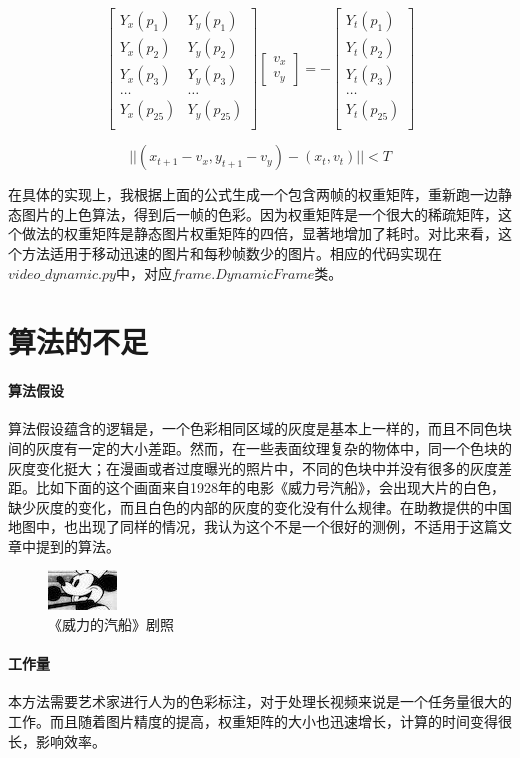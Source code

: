 \documentclass{article}
\begin{document}
\begin{equation}
\left[
\begin{array}{cc}
Y_x(p_1) & Y_y(p_1)\\
Y_x(p_2) & Y_y(p_2)\\
Y_x(p_3) & Y_y(p_3)\\
\ldots & \ldots \\
Y_x(p_{25}) & Y_y(p_{25})\\
\end{array}
\right]
\left[
\begin{array}{c}
v_x\\
v_y
\end{array}
\right]
= - 
\left[
\begin{array}{c}
Y_t(p_1)\\
Y_t(p_2)\\
Y_t(p_3)\\
\ldots\\
Y_t(p_{25})\\
\end{array}
\right]
\end{equation}

\begin{equation}
||(x_{t+1}-v_x, y_{t+1}-v_y) - (x_t, v_t)||< T
\end{equation}

在具体的实现上，我根据上面的公式生成一个包含两帧的权重矩阵，重新跑一边静态图片的上色算法，得到后一帧的色彩。因为权重矩阵是一个很大的稀疏矩阵，这个做法的权重矩阵是静态图片权重矩阵的四倍，显著地增加了耗时。对比来看，这个方法适用于移动迅速的图片和每秒帧数少的图片。相应的代码实现在$video\_dynamic.py$中，对应$frame.DynamicFrame$类。

\section{算法的不足}

\paragraph{算法假设}算法假设蕴含的逻辑是，一个色彩相同区域的灰度是基本上一样的，而且不同色块间的灰度有一定的大小差距。然而，在一些表面纹理复杂的物体中，同一个色块的灰度变化挺大；在漫画或者过度曝光的照片中，不同的色块中并没有很多的灰度差距。比如下面的这个画面来自1928年的电影《威力号汽船》，会出现大片的白色，缺少灰度的变化，而且白色的内部的灰度的变化没有什么规律。在助教提供的中国地图中，也出现了同样的情况，我认为这个不是一个很好的测例，不适用于这篇文章中提到的算法。
\begin{figure}[H]
\centering
\includegraphics[scale=2]{gray_9.jpeg}
\caption{《威力的汽船》剧照}
\end{figure}

\paragraph{工作量}本方法需要艺术家进行人为的色彩标注，对于处理长视频来说是一个任务量很大的工作。而且随着图片精度的提高，权重矩阵的大小也迅速增长，计算的时间变得很长，影响效率。


\paragraph{}
\end{document}
